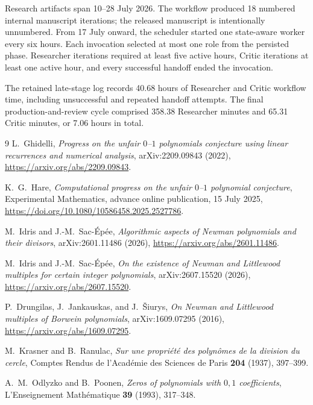 \documentclass[11pt]{article}
\theoremstyle{remark}
\numberwithin{equation}{section}
\begin{document}
Research artifacts span 10--28 July 2026.  The workflow produced 18 numbered
internal manuscript iterations; the released manuscript is intentionally
unnumbered.  From 17 July onward, the scheduler started one state-aware worker
every six hours.  Each invocation selected at most one role from the persisted
phase.  Researcher iterations required at least five active hours, Critic
iterations at least one active hour, and every successful handoff ended the
invocation.

The retained late-stage log records 40.68 hours of Researcher and Critic
workflow time, including unsuccessful and repeated handoff attempts.  The final
production-and-review cycle comprised 358.38 Researcher minutes and 65.31
Critic minutes, or 7.06 hours in total.

\begin{thebibliography}{9}
L.~Ghidelli,
\emph{Progress on the unfair $0$--$1$ polynomials conjecture using linear
recurrences and numerical analysis}, arXiv:2209.09843 (2022),
\url{https://arxiv.org/abs/2209.09843}.

K.~G.~Hare,
\emph{Computational progress on the unfair $0$--$1$ polynomial conjecture},
Experimental Mathematics, advance online publication, 15 July 2025,
\url{https://doi.org/10.1080/10586458.2025.2527786}.

M.~Idris and J.-M.~Sac-\'Ep\'ee,
\emph{Algorithmic aspects of Newman polynomials and their divisors},
arXiv:2601.11486 (2026),
\url{https://arxiv.org/abs/2601.11486}.

M.~Idris and J.-M.~Sac-\'Ep\'ee,
\emph{On the existence of Newman and Littlewood multiples for certain integer
polynomials}, arXiv:2607.15520 (2026),
\url{https://arxiv.org/abs/2607.15520}.

P.~Drungilas, J.~Jankauskas, and J.~\v{S}iurys,
\emph{On Newman and Littlewood multiples of Borwein polynomials},
arXiv:1609.07295 (2016),
\url{https://arxiv.org/abs/1609.07295}.

M.~Krasner and B.~Ranulac,
\emph{Sur une propri\'et\'e des polyn\^omes de la division du cercle},
Comptes Rendus de l'Acad\'emie des Sciences de Paris \textbf{204} (1937),
397--399.

A.~M.~Odlyzko and B.~Poonen,
\emph{Zeros of polynomials with $0,1$ coefficients},
L'Enseignement Math\'ematique \textbf{39} (1993), 317--348.
\end{thebibliography}
\end{document}
